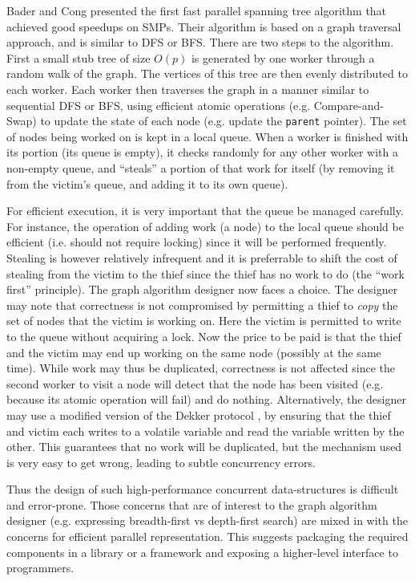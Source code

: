 Bader and Cong \cite{BC04a} presented the first fast parallel spanning
tree algorithm that achieved good speedups on SMPs. Their algorithm is
based on a graph traversal approach, and is similar to DFS or BFS.
There are two steps to the algorithm. First a small stub tree of size
$O(p)$ is generated by one worker through a random walk of the
graph. The vertices of this tree are then evenly distributed to each
worker.  Each worker then traverses the graph in a manner similar to
sequential DFS or BFS, using efficient atomic operations (e.g.{}
Compare-and-Swap) to update the state of each node (e.g.{} update the
{\tt parent} pointer). The set of nodes being worked on is kept in a local queue.
When a worker is finished with its portion (its queue is empty), it
checks randomly for any other worker with a non-empty queue, and
``steals'' a portion of that work for itself (by removing it from the
victim's queue, and adding it to its own queue).

For efficient execution, it is very important that the queue be
managed carefully. For instance, the operation of adding work (a node)
to the local queue should be efficient (i.e.{} should not require
locking) since it will be performed frequently. Stealing is however
relatively infrequent and it is preferrable to shift the cost of
stealing from the victim to the thief since the thief has no work to
do (the ``work first'' principle). The graph algorithm designer now
faces a choice. The designer may note \cite{BC04} that correctness is
not compromised by permitting a thief to {\em copy} the set of nodes
that the victim is working on. Here the victim is permitted to write
to the queue without acquiring a lock. Now the price to be paid is
that the thief and the victim may end up working on the same node
(possibly at the same time).  While work may thus be duplicated,
correctness is not affected since the second worker to visit a node
will detect that the node has been visited (e.g.{} because its atomic
operation will fail) and do nothing. Alternatively, the designer may
use a modified version of the Dekker protocol \cite{cilk}, by ensuring
that the thief and victim each writes to a volatile variable and read
the variable written by the other. This guarantees that no work will
be duplicated, but the mechanism used is very easy to get wrong,
leading to subtle concurrency errors.

Thus the design of such high-performance concurrent data-structures is
difficult and error-prone. Those concerns that are of interest to the
graph algorithm designer (e.g.{} expressing breadth-first vs
depth-first search) are mixed in with the concerns for efficient
parallel representation.  This suggests packaging the required
components in a library or a framework and exposing a higher-level
interface to programmers.

